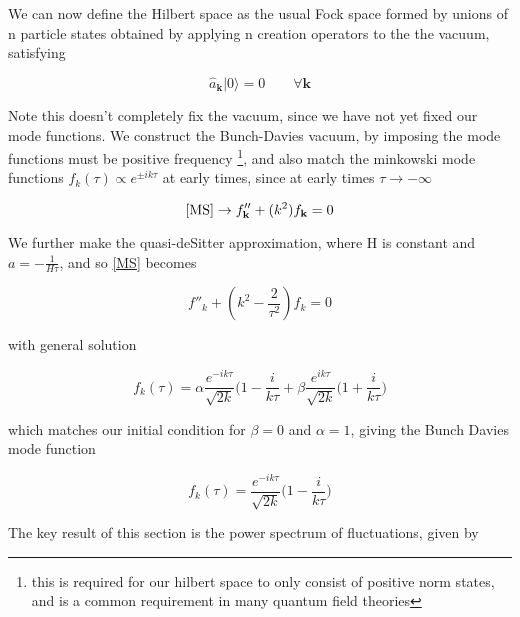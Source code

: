 \documentclass[a4paper,11pt]{article}
\renewcommand{\v}[1]{\mathbf{#1}}
\newcommand{\ann}[1]{\hat{a}_{\v{#1}}}
\newcommand{\vac}{|0\rangle}
\begin{document}
We can now define the Hilbert space as the usual Fock space formed by unions of n particle states obtained by applying n creation operators to the the vacuum, satisfying 

\begin{equation}
\ann{k}\vac =0 \qquad \forall \v{k}
\end{equation}

Note this doesn't completely fix the vacuum, since we have not yet fixed our mode functions. We construct the Bunch-Davies vacuum, by imposing the mode functions must be positive frequency \footnote{this is required for our hilbert space to only consist of positive norm states, and is a common requirement in many quantum field theories}, and also match the minkowski mode functions $f_k(\tau) \propto e^{\pm ik\tau}$ at early times, since at early times $\tau \rightarrow -\infty$

\begin{equation}
\ref{MS} \rightarrow  f''_{\v{k}} + (k^2)f_{\v{k}} = 0
\end{equation}

We further make the quasi-deSitter approximation, where H is constant and $a=-\frac{1}{H\tau}$, and so \ref{MS} becomes

\begin{equation}
f''_k + (k^2-\frac{2}{\tau^2})f_k = 0
\end{equation}

with general solution

\begin{equation}
f_k(\tau) = \alpha \frac{e^{-ik\tau}}{\sqrt{2k}}{(1-\frac{i}{k\tau}} + \beta \frac{e^{ik\tau}}{\sqrt{2k}}{(1+\frac{i}{k\tau}})
\end{equation}

which matches our initial condition for $\beta = 0$ and $\alpha=1$, giving the Bunch Davies mode function 

\begin{equation}
f_k(\tau) = \frac{e^{-ik\tau}}{\sqrt{2k}}{(1-\frac{i}{k\tau}})
\end{equation}

The key result of this section is the power spectrum of fluctuations, given by 

%
%
%
\end{document}
